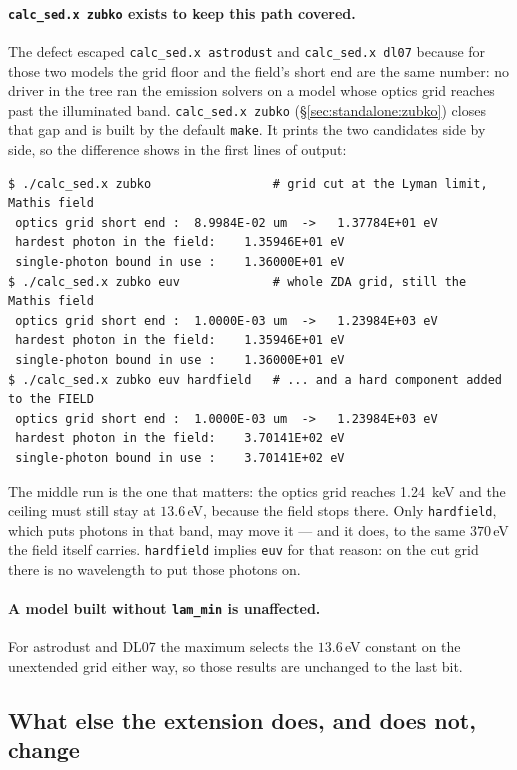 \documentclass{my_memo}
\newcommand{\code}[1]{\texttt{#1}}
\begin{document}
\paragraph{\code{calc\_sed.x zubko} exists to keep this path covered.} The defect
escaped \code{calc\_sed.x astrodust} and \code{calc\_sed.x dl07} because for those two
models the grid floor and the field's short end are the same number: no driver
in the tree ran the emission solvers on a model whose optics grid reaches past
the illuminated band. \code{calc\_sed.x zubko} (\S\ref{sec:standalone:zubko}) closes
that gap and is built by the default \code{make}. It prints the two candidates
side by side, so the difference shows in the first lines of output:
\begin{lstlisting}[style=sh]
$ ./calc_sed.x zubko                 # grid cut at the Lyman limit, Mathis field
 optics grid short end :  8.9984E-02 um  ->   1.37784E+01 eV
 hardest photon in the field:    1.35946E+01 eV
 single-photon bound in use :    1.36000E+01 eV
$ ./calc_sed.x zubko euv             # whole ZDA grid, still the Mathis field
 optics grid short end :  1.0000E-03 um  ->   1.23984E+03 eV
 hardest photon in the field:    1.35946E+01 eV
 single-photon bound in use :    1.36000E+01 eV
$ ./calc_sed.x zubko euv hardfield   # ... and a hard component added to the FIELD
 optics grid short end :  1.0000E-03 um  ->   1.23984E+03 eV
 hardest photon in the field:    3.70141E+02 eV
 single-photon bound in use :    3.70141E+02 eV
\end{lstlisting}
The middle run is the one that matters: the optics grid reaches
\SI{1.24}{\kilo\electronvolt} and the ceiling must still stay at $13.6\,$eV,
because the field stops there. Only \code{hardfield}, which puts photons in that
band, may move it --- and it does, to the same $370\,$eV the field itself
carries. \code{hardfield} implies \code{euv} for that reason: on the cut grid
there is no wavelength to put those photons on.

\paragraph{A model built without \code{lam\_min} is unaffected.} For astrodust
and DL07 the maximum selects the $13.6\,$eV constant on the unextended grid
either way, so those results are unchanged to the last bit.

\subsection{What else the extension does, and does not, change}
\end{document}
